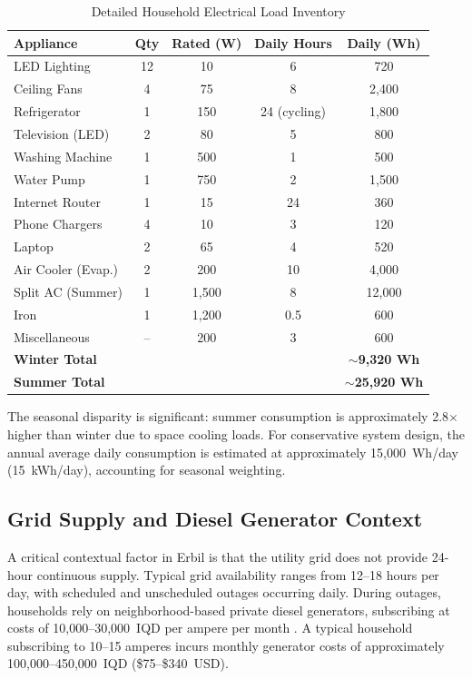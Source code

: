 \begin{table}[H]
\centering
\caption{Detailed Household Electrical Load Inventory}
\label{tab:load_profile}
\small
\begin{tabular}{@{}p{3.5cm} c c c c@{}}
\toprule
\textbf{Appliance} & \textbf{Qty} & \textbf{Rated (W)} & \textbf{Daily Hours} & \textbf{Daily (Wh)} \\
\midrule
LED Lighting & 12 & 10 & 6 & 720 \\
Ceiling Fans & 4 & 75 & 8 & 2,400 \\
Refrigerator & 1 & 150 & 24 (cycling) & 1,800 \\
Television (LED) & 2 & 80 & 5 & 800 \\
Washing Machine & 1 & 500 & 1 & 500 \\
Water Pump & 1 & 750 & 2 & 1,500 \\
Internet Router & 1 & 15 & 24 & 360 \\
Phone Chargers & 4 & 10 & 3 & 120 \\
Laptop & 2 & 65 & 4 & 520 \\
Air Cooler (Evap.) & 2 & 200 & 10 & 4,000 \\
Split AC (Summer) & 1 & 1,500 & 8 & 12,000 \\
Iron & 1 & 1,200 & 0.5 & 600 \\
Miscellaneous & -- & 200 & 3 & 600 \\
\midrule
\textbf{Winter Total} & & & & \textbf{$\sim$9,320 Wh} \\
\textbf{Summer Total} & & & & \textbf{$\sim$25,920 Wh} \\
\bottomrule
\end{tabular}
\end{table}

The seasonal disparity is significant: summer consumption is approximately 2.8$\times$ higher than winter due to space cooling loads. For conservative system design, the annual average daily consumption is estimated at approximately 15,000~Wh/day (15~kWh/day), accounting for seasonal weighting.


\subsection{Grid Supply and Diesel Generator Context}

A critical contextual factor in Erbil is that the utility grid does not provide 24-hour continuous supply. Typical grid availability ranges from 12--18 hours per day, with scheduled and unscheduled outages occurring daily. During outages, households rely on neighborhood-based private diesel generators, subscribing at costs of 10,000--30,000~IQD per ampere per month \cite{rudaw2024}. A typical household subscribing to 10--15 amperes incurs monthly generator costs of approximately 100,000--450,000~IQD (\$75--\$340~USD).

